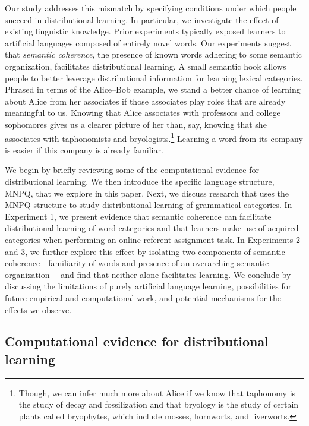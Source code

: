 \documentclass[man,floatsintext]{apa6}
\begin{document}
Our study addresses this mismatch by specifying conditions under which people succeed in distributional learning. In particular, we investigate the effect of existing linguistic knowledge. Prior experiments typically exposed learners to artificial languages composed of entirely novel words. Our experiments suggest that \emph{semantic coherence}, the presence of known words adhering to some semantic organization, facilitates distributional learning. A small semantic hook allows people to better leverage distributional information for learning lexical categories. Phrased in terms of the Alice--Bob example, we stand a better chance of learning about Alice from her associates if those associates play roles that are already meaningful to us. Knowing that Alice associates with professors and college sophomores gives us a clearer picture of her than, say, knowing that she associates with taphonomists and bryologists.\footnote{Though, we can infer much more about Alice if we know that taphonomy is the study of decay and fossilization and that bryology is the study of certain plants called bryophytes, which include mosses, hornworts, and liverworts.} Learning a word from its company is easier if this company is already familiar. 

We begin by briefly reviewing some of the computational evidence for distributional learning. We then introduce the specific language structure, MNPQ, that we explore in this paper. Next, we discuss research that uses the MNPQ structure to study distributional learning of grammatical categories. In Experiment 1, we present evidence that semantic coherence can facilitate distributional learning of word categories and that learners make use of acquired categories when performing an online referent assignment task. In Experiments 2 and 3, we further explore this effect by isolating two components of semantic coherence---familiarity of words and presence of an overarching semantic organization ---and find that neither alone facilitates learning. We conclude by discussing the limitations of purely artificial language learning, possibilities for future empirical and computational work, and potential mechanisms for the effects we observe.
 
\subsection{Computational evidence for distributional learning}
\end{document}
